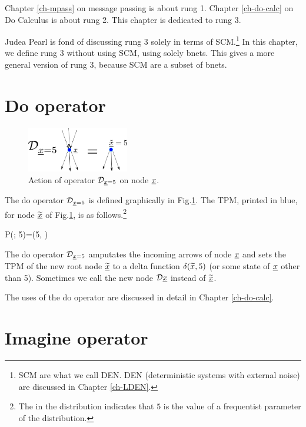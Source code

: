Chapter \ref{ch-mpass}
on message passing
is about rung 1.
Chapter \ref{ch-do-calc}
on Do Calculus is about rung 2.
This chapter is dedicated to rung 3.

Judea Pearl
is fond of discussing rung 3 solely
in terms of SCM.\footnote{SCM are
what we call DEN. DEN (deterministic systems
with external noise) are discussed in
Chapter \ref{ch-LDEN}. }
In this chapter,
we define rung 3
without using SCM, using solely
bnets.
This gives a more general
version of rung 3,
because SCM are a subset of bnets.


\section{Do operator}


\begin{figure}[h!]
\centering
\includegraphics[width=1.75in]
{counterf/rho-op.png}
\caption{Action
of  operator $\cald_{\rvx=5}$
on node $\rvx$.}
\label{fig-rho-op}
\end{figure}

The do operator $\cald_{\rvx=5}$
is defined graphically in Fig.\ref{fig-rho-op}.
The TPM, printed in blue,
 for node $\TIL{\rvx}$ of Fig.\ref{fig-rho-op},
is as follows.\footnote{The 
in the distribution
indicates that $5$ 
is the value of a frequentist parameter of the distribution.}

\beq\color{blue}
P(; 5)=\delta(5, )
\eeq


The do operator $\cald_{\rvx=5}$
amputates
the incoming arrows of node $\rvx$
and sets the TPM
of the new root node $\TIL{\rvx}$
to a delta function $\delta(
{\widetilde{x}}, 5)$
(or some state of $\rvx$
 other than 5).
Sometimes we call the new node
$\cald\rvx$
instead of
$\TIL{\rvx}$.

The uses of the do operator are discussed
in detail in Chapter \ref{ch-do-calc}.

\section{Imagine operator}

